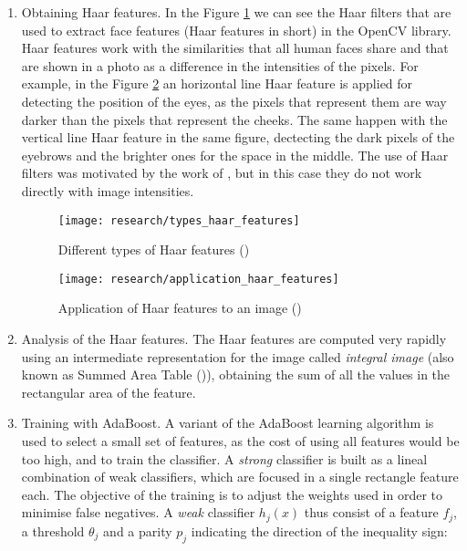 	\begin{enumerate}
		\item Obtaining Haar features. In the Figure \ref{fig:haar_features} we can see the Haar filters that are used to extract face features (Haar features in short) in the OpenCV library. Haar features work with the similarities that all human faces share and that are shown in a photo as a difference in the intensities of the pixels. For example, in the Figure \ref{fig:application_haar_features} an horizontal line Haar feature is applied for detecting the position of the eyes, as the pixels that represent them are way darker than the pixels that represent the cheeks. The same happen with the vertical line Haar feature in the same figure, dectecting the dark pixels of the eyebrows and the brighter ones for the space in the middle. The use of Haar filters was motivated by the work of \cite{haar_features_before_vj}, but in this case they do not work directly with image intensities. 

		\begin{figure}[!ht]
			\centering
			\texttt{[image: research/types\_haar\_features]}
			\caption{Different types of Haar features (\cite{opencv_haar_cascade_tut})}
			\label{fig:haar_features}
		\end{figure}

		\begin{figure}[!ht]
			\centering
			\texttt{[image: research/application\_haar\_features]}
			\caption{Application of Haar features to an image (\cite{viola2001rapid})}
			\label{fig:application_haar_features}
		\end{figure}

		\item Analysis of the Haar features. The Haar features are computed very rapidly using an intermediate representation for the image called \textit{integral image} (also known as Summed Area Table (\cite{crow_summed_table})), obtaining the sum of all the values in the rectangular area of the feature. 

		\item Training with AdaBoost. A variant of the AdaBoost learning algorithm is used to select a small set of features, as the cost of using all features would be too high, and to train the classifier. A \textit{strong} classifier is built as a lineal combination of weak classifiers, which are focused in a single rectangle feature each. The objective of the training is to adjust the weights used in order to minimise false negatives. A \textit{weak} classifier $h_j(x)$ thus consist of a feature $f_j$, a threshold $\theta_j$ and a parity $p_j$ indicating the direction of the inequality sign:


\end{enumerate}

